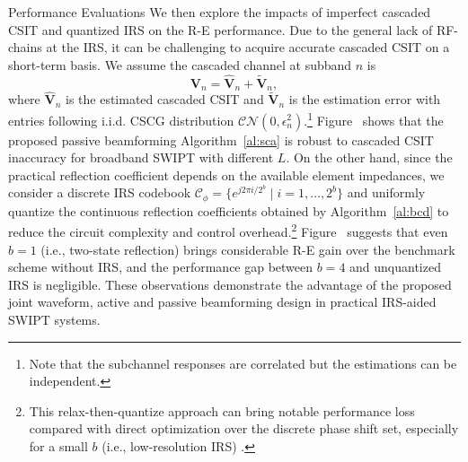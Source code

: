 \documentclass[journal]{IEEEtran}
\begin{document}
\begin{section}{Performance Evaluations}
		We then explore the impacts of imperfect cascaded CSIT and quantized IRS on the R-E performance. Due to the general lack of RF-chains at the IRS, it can be challenging to acquire accurate cascaded CSIT on a short-term basis. We assume the cascaded channel at subband $n$ is
		\begin{equation}
			\boldsymbol{V}_{n} = \hat{\boldsymbol{V}}_{n} + \tilde{\boldsymbol{V}}_{n},
		\end{equation}
		where $\hat{\boldsymbol{V}}_{n}$ is the estimated cascaded CSIT and $\tilde{\boldsymbol{V}}_{n}$ is the estimation error with entries following i.i.d. CSCG distribution $\mathcal{CN}(0, \epsilon_{n}^2)$.\footnote{Note that the subchannel responses are correlated but the estimations can be independent.} Figure~ shows that the proposed passive beamforming Algorithm~\ref{al:sca} is robust to cascaded CSIT inaccuracy for broadband SWIPT with different $L$. On the other hand, since the practical reflection coefficient depends on the available element impedances, we consider a discrete IRS codebook $\mathcal{C}_\phi = \{e^{j 2 \pi i / 2^b} \mid i = 1, \dots, 2^b\}$ and uniformly quantize the continuous reflection coefficients obtained by Algorithm~\ref{al:bcd} to reduce the circuit complexity and control overhead.\footnote{This relax-then-quantize approach can bring notable performance loss compared with direct optimization over the discrete phase shift set, especially for a small $b$ (i.e., low-resolution IRS) \cite{Wu2020c}.} Figure~ suggests that even $b=1$ (i.e., two-state reflection) brings considerable R-E gain over the benchmark scheme without IRS, and the performance gap between $b=4$ and unquantized IRS is negligible. These observations demonstrate the advantage of the proposed joint waveform, active and passive beamforming design in practical IRS-aided SWIPT systems.
	\end{section}
\end{document}
